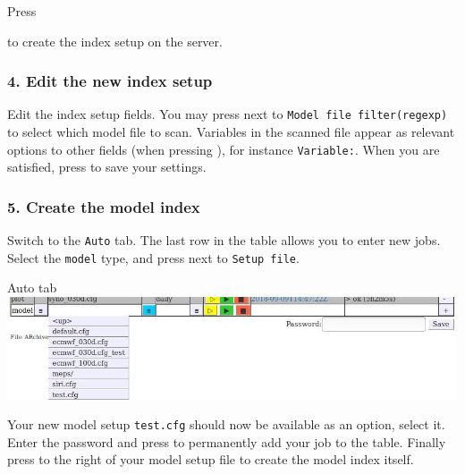 \documentclass[letterpaper,10pt,twoside,twocolumn,openany]{book}
\begin{document}
Press { to create the index setup on the server.
\subsubsection{4. Edit the new index setup}
Edit the index setup fields.
You may press  next to
\lstinline!Model file filter(regexp)! to select which model file to scan.
Variables in the scanned file appear as
relevant options to other fields (when pressing ),
for instance  \lstinline!Variable:!.
When you are satisfied, press  to save your settings.
\subsubsection{5. Create the model index}
Switch to the \lstinline!Auto! tab.
The last row in the table allows you to enter new jobs.
Select the \lstinline!model! type, and press  next to \lstinline!Setup file!.
\begin{paperbox}{Auto tab}
  \includegraphics[width=\columnwidth]{how_auto.jpg}
\end{paperbox}
Your new model setup \lstinline!test.cfg! should now be available as an option, select it.
Enter the password and press 
to permanently add your job to the table.
Finally press  to the right of your model setup file to create the model index itself.

}
\end{document}
